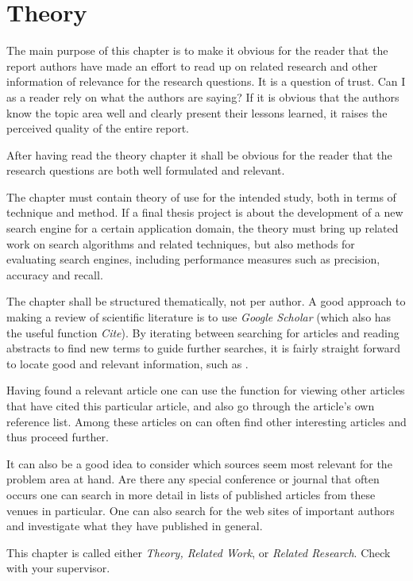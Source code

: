 
\chapter{Theory}
\label{cha:theory}

The main purpose of this chapter is to make it obvious for
the reader that the report authors have made an effort to read
up on related research and other information of relevance for
the research questions. It is a question of trust. Can I as a
reader rely on what the authors are saying? If it is obvious
that the authors know the topic area well and clearly present
their lessons learned, it raises the perceived quality of the
entire report.

After having read the theory chapter it shall be obvious for
the reader that the research questions are both well
formulated and relevant.

The chapter must contain theory of use for the intended
study, both in terms of technique and method. If a final thesis
project is about the development of a new search engine for
a certain application domain, the theory must bring up related
work on search algorithms and related techniques, but also
methods for evaluating search engines, including
performance measures such as precision, accuracy and
recall.

The chapter shall be structured thematically, not per author.
A good approach to making a review of scientific literature
is to use \emph{Google Scholar} (which also has the useful function
\emph{Cite}). By iterating between searching for articles and reading
abstracts to find new terms to guide further searches, it is
fairly straight forward to locate good and relevant
information, such as \cite{test}.

Having found a relevant article one can use the function for
viewing other articles that have cited this particular article,
and also go through the article’s own reference list. Among
these articles on can often find other interesting articles and
thus proceed further.

It can also be a good idea to consider which sources seem
most relevant for the problem area at hand. Are there any
special conference or journal that often occurs one can search
in more detail in lists of published articles from these venues
in particular. One can also search for the web sites of
important authors and investigate what they have published
in general.

This chapter is called either \emph{Theory, Related Work}, or
\emph{Related Research}. Check with your supervisor.



